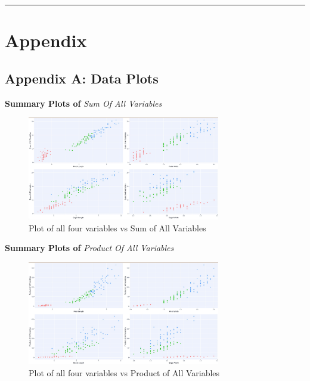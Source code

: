 \documentclass[12pt,]{article}
\begin{document}
\begin{center}\rule{0.5\linewidth}{\linethickness}\end{center}

\newpage

\hypertarget{appendix}{%
\section{Appendix}\label{appendix}}

\hypertarget{appendix-a-data-plots}{%
\subsection{Appendix A: Data Plots}\label{appendix-a-data-plots}}

\textbf{Summary Plots of} \textit{Sum Of All Variables}

\begin{figure}[!h]
\begin{center}
\includegraphics[width=0.75\textwidth]{SumOfAll.jpeg}
\end{center}
\caption[Iris Data Sum Of All Variable Plot]{Plot of all four variables vs Sum of All Variables}
\end{figure}

\textbf{Summary Plots of} \textit{Product Of All Variables}

\begin{figure}[!h]
\begin{center}
\includegraphics[width=0.75\textwidth]{ProdOfAll.jpeg}
\end{center}
\caption[Iris Data Product Of All Variable Plot]{Plot of all four variables vs Product of All Variables}
\end{figure}
\end{document}
